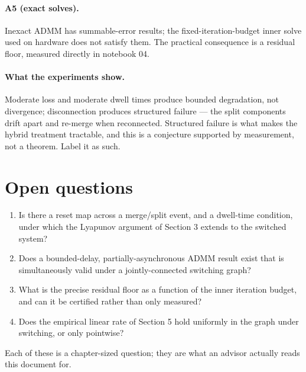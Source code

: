 \documentclass[11pt]{article}
\begin{document}
\paragraph{A5 (exact solves).} Inexact ADMM has summable-error results; the
fixed-iteration-budget inner solve used on hardware does not satisfy them. The practical
consequence is a residual floor, measured directly in notebook 04.

\paragraph{What the experiments show.} Moderate loss and moderate dwell times produce
bounded degradation, not divergence; disconnection produces structured failure --- the
split components drift apart and re-merge when reconnected. Structured failure is what
makes the hybrid treatment tractable, and this is a conjecture supported by measurement,
not a theorem. Label it as such.

\section{Open questions}

\begin{enumerate}
\item Is there a reset map across a merge/split event, and a dwell-time condition, under
  which the Lyapunov argument of Section 3 extends to the switched system?
\item Does a bounded-delay, partially-asynchronous ADMM result exist that is
  simultaneously valid under a jointly-connected switching graph?
\item What is the precise residual floor as a function of the inner iteration budget, and
  can it be certified rather than only measured?
\item Does the empirical linear rate of Section 5 hold uniformly in the graph under
  switching, or only pointwise?
\end{enumerate}

Each of these is a chapter-sized question; they are what an advisor actually reads this
document for.

\nocite{*}


\end{document}
